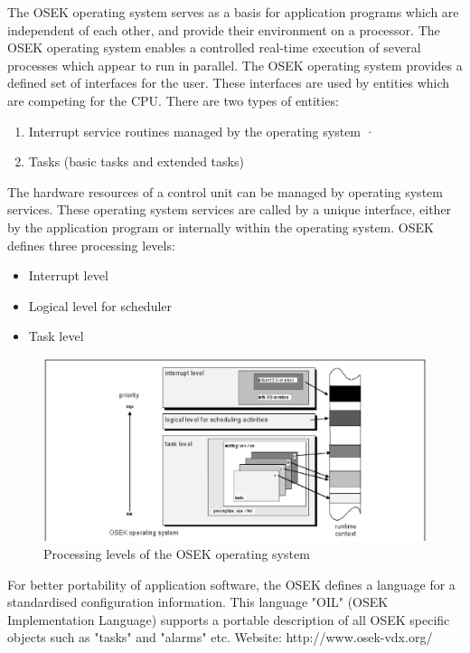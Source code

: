The OSEK operating system serves as a basis for application programs which are independent
of each other, and provide their environment on a processor. The OSEK operating system
enables a controlled real-time execution of several processes which appear to run in parallel.
The OSEK operating system provides a defined set of interfaces for the user. These interfaces
are used by entities which are competing for the CPU. There are two types of entities:
\begin{enumerate}
\item Interrupt service routines managed by the operating system
·
\item Tasks (basic tasks and extended tasks)
\end{enumerate}

The hardware resources of a control unit can be managed by operating system services. These
operating system services are called by a unique interface, either by the application program or
internally within the operating system.
OSEK defines three processing levels:
\begin{itemize}
\item  Interrupt level
\item Logical level for scheduler
\item Task level
\end{itemize}

\begin{figure}[htbp]
\begin{center}
\includegraphics[scale=0.4]{figures/nxtosek/osektask.eps}
\caption{Processing levels of the OSEK operating system}
\end{center}
\end{figure}
For better portability of application software, the OSEK defines a language for a standardised
configuration information. This language "OIL" (OSEK Implementation Language) supports a
portable description of all OSEK specific objects such as "tasks" and "alarms" etc.
Website: http://www.osek-vdx.org/
